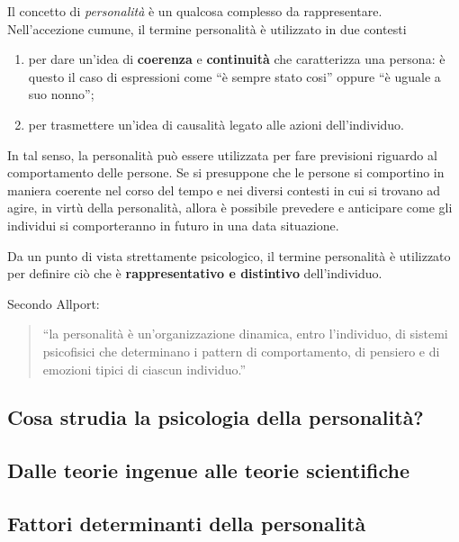 \documentclass{subfiles}
\begin{document}
Il concetto di \emph{personalità} è un qualcosa complesso da rappresentare.
Nell'accezione cumune, il termine personalità è utilizzato in due contesti
\begin{enumerate}
    \item per dare un'idea di \textbf{coerenza} e \textbf{continuità} che caratterizza una persona:
          è questo il caso di espressioni come ``è sempre stato cosi'' oppure ``è uguale a suo nonno'';
    \item per trasmettere un'idea di causalità legato alle azioni dell'individuo.
\end{enumerate}

\noindent In tal senso, la personalità può essere utilizzata per fare previsioni riguardo al comportamento delle persone.
Se si presuppone che le persone si comportino in maniera coerente nel corso del tempo e nei diversi contesti in cui si trovano ad agire, in virtù della personalità,
allora è possibile prevedere e anticipare come gli individui si comporteranno in futuro in una data situazione.

Da un punto di vista strettamente psicologico, il termine personalità è utilizzato per definire ciò che è \textbf{rappresentativo e distintivo} dell'individuo.
\begin{framed}
    Secondo Allport:
    \begin{quote}
        ``la personalità è un'organizzazione dinamica, entro l'individuo, di sistemi psicofisici che determinano i pattern di comportamento,
        di pensiero e di emozioni tipici di ciascun individuo.''
    \end{quote}
\end{framed}

\subsection{Cosa strudia la psicologia della personalità?}


\subsection{Dalle teorie ingenue alle teorie scientifiche}


\subsection{Fattori determinanti della personalità}

\end{document}
